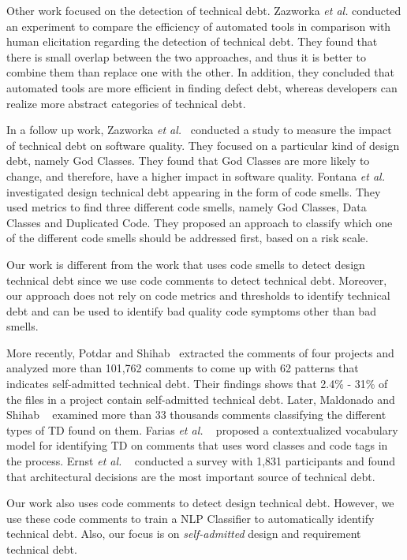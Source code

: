 Other work focused on the detection of technical debt. Zazworka \textit{et al.} \cite{Zazworka2013CSE} conducted an experiment to compare the efficiency of automated tools in comparison with human elicitation regarding the detection of technical debt. They found that there is small overlap between the two approaches, and thus it is better to combine them than replace one with the other. In addition, they concluded that automated tools are more efficient in finding defect debt, whereas developers can realize more abstract categories of technical debt.

In a follow up work, Zazworka \textit{et al.}~\cite{Zazworka2011MTD} conducted a study to measure the impact of technical debt on software quality. They focused on a particular kind of design debt, namely God Classes. They found that God Classes are more likely to change, and therefore, have a higher impact in software quality. Fontana \textit{et al.}~\cite{Fontana2012MTD} investigated design technical debt appearing in the form of code smells. They used metrics to find three different code smells, namely God Classes, Data Classes and Duplicated Code. They proposed an approach to classify which one of the different code smells should be addressed first, based on a risk scale. 

Our work is different from the work that uses code smells to detect design technical debt since we use code comments to detect technical debt. Moreover, our approach does not rely on code metrics and thresholds to identify technical debt and can be used to identify bad quality code symptoms other than bad smells.

More recently, Potdar and Shihab~\cite{Potdar2014ICSME} extracted the comments of four projects and analyzed more than 101,762 comments to come up with 62  patterns that indicates self-admitted technical debt. Their findings shows that 2.4\% - 31\% of the files in a project contain self-admitted technical debt. Later, Maldonado and Shihab ~\cite{Maldonado2015MTD} examined more than 33 thousands comments classifying the different types of TD found on them. Farias \textit{et al.} ~\cite{Farias2015MTD}  proposed a contextualized vocabulary model for identifying TD on comments that uses word classes and code tags in the process. Ernst \textit{et al.} ~\cite{Ernst2015FSE} conducted a survey with 1,831 participants and found that architectural decisions are the most important source of technical debt.

Our work also uses code comments to detect design technical debt. However, we use these code comments to train a NLP Classifier to automatically identify technical debt. Also, our focus is on \emph{self-admitted} design and requirement technical debt.

